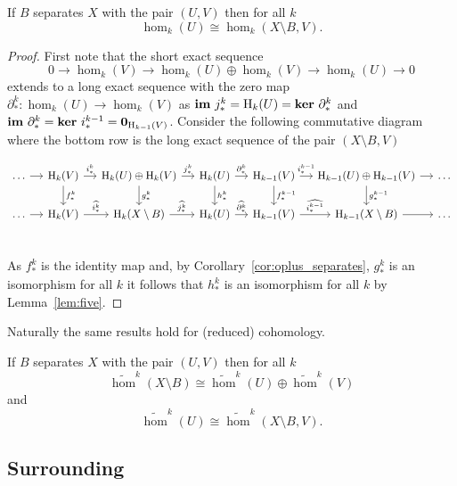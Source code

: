 \begin{lemma}\label{lem:iso_separates}
  If $B$ separates $X$ with the pair $(U, V)$ then for all $k$
  \[ \hom_k(U)\cong \hom_k(X\setminus B, V).\]
\end{lemma}
\begin{proof}
  First note that the short exact sequence
  \[ 0\to \hom_k(V)\to \hom_k(U)\oplus\hom_k(V)\to \hom_k(U)\to 0\]
  extends to a long exact sequence with the zero map $\partial_*^k : \hom_k(U)\to \hom_k(V)$ as $\mathbf{im}~j^k_* = \mathrm{H}_k(U) = \mathbf{ker}~\partial_*^k$ and $\mathbf{im}~\partial_*^k = \mathbf{ker}~ i^{k-1}_* = \mathbf{0}_{\mathrm{H}_{k-1}(V)}$.
  Consider the following commutative diagram where the bottom row is the long exact sequence of the pair $(X\setminus B, V)$
  \begin{small}
  \[\begin{tikzcd}[column sep=small]
    \ldots\ar[r]  & \hom_k(V)\ar[r, "i_*^k"]\ar[d, "f_*^k"]
                  & \hom_k(U)\oplus\hom_k(V)\ar[r, "j_*^k"]\ar[d, "g_*^k"]
                  & \hom_k(U)\ar[r, "\partial_*^k"]\ar[d, "h_*^k"]
                  & \hom_{k-1}(V)\ar[r, "i_*^{k-1}"]\ar[d, "f_*^{k-1}"]
                  & \hom_{k-1}(U)\oplus\hom_{k-1}(V)\ar[r]\ar[d, "g_*^{k-1}"]
                  & \ldots\\
    \ldots\ar[r]  & \hom_k(V)\ar[r, "\widehat{i_*^k}"]
                  & \hom_k(X\setminus B)\ar[r, "\widehat{j_*^k}"]
                  & \hom_k(U)\ar[r, "\widehat{\partial_*^k}"]
                  & \hom_{k-1}(V)\ar[r, "\widehat{i_*^{k-1}}"]
                  & \hom_{k-1}(X\setminus B)\ar[r]
                  & \ldots\\
  \end{tikzcd}\]
  \end{small}
  As $f_*^k$ is the identity map and, by Corollary~\ref{cor:oplus_separates}, $g^k_*$ is an isomorphism for all $k$ it follows that $h_*^k$ is an isomorphism for all $k$ by Lemma~\ref{lem:five}.
\end{proof}

Naturally the same results hold for (reduced) cohomology.

\begin{corollary}\label{cor:reduced_cohom}
  If $B$ separates $X$ with the pair $(U, V)$ then for all $k$
  \[ \tilde{\hom}^k(X\setminus B) \cong \tilde{\hom}^k(U)\oplus \tilde{\hom}^k(V) \]
  and
  \[\tilde{\hom}^k(U)\cong \tilde{\hom}^k(X\setminus B, V).\]
\end{corollary}

\subsection{Surrounding}


